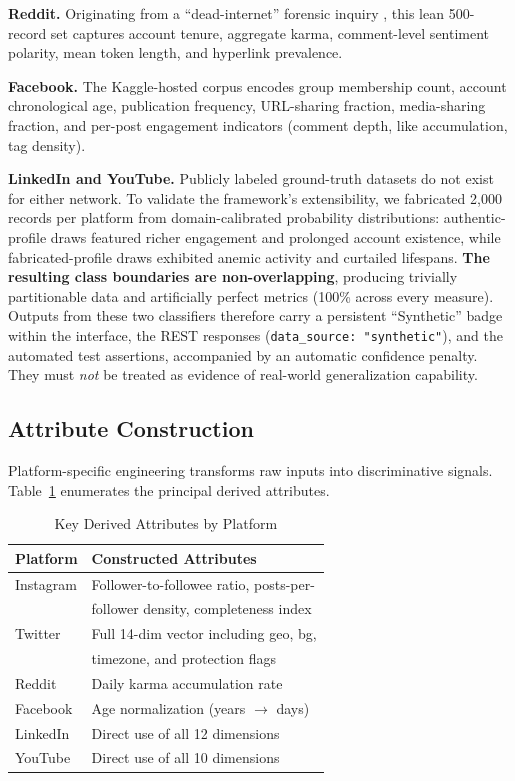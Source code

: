 \documentclass[conference]{IEEEtran}
\begin{document}
\textbf{Reddit.} Originating from a ``dead-internet'' forensic inquiry \cite{reddit_dataset}, this lean 500-record set captures account tenure, aggregate karma, comment-level sentiment polarity, mean token length, and hyperlink prevalence.

\textbf{Facebook.} The Kaggle-hosted corpus \cite{facebook_dataset} encodes group membership count, account chronological age, publication frequency, URL-sharing fraction, media-sharing fraction, and per-post engagement indicators (comment depth, like accumulation, tag density).

\textbf{LinkedIn and YouTube.} Publicly labeled ground-truth datasets do not exist for either network. To validate the framework's extensibility, we fabricated 2{,}000 records per platform from domain-calibrated probability distributions: authentic-profile draws featured richer engagement and prolonged account existence, while fabricated-profile draws exhibited anemic activity and curtailed lifespans. \textbf{The resulting class boundaries are non-overlapping}, producing trivially partitionable data and artificially perfect metrics (100\% across every measure). Outputs from these two classifiers therefore carry a persistent ``Synthetic'' badge within the interface, the REST responses (\texttt{data\_source: "synthetic"}), and the automated test assertions, accompanied by an automatic confidence penalty. They must \textit{not} be treated as evidence of real-world generalization capability.

\subsection{Attribute Construction}

Platform-specific engineering transforms raw inputs into discriminative signals. Table~\ref{tab:features} enumerates the principal derived attributes.

\begin{table}[htbp]
\caption{Key Derived Attributes by Platform}
\label{tab:features}
\centering
\begin{tabular}{ll}
\toprule
\textbf{Platform} & \textbf{Constructed Attributes} \\
\midrule
Instagram & Follower-to-followee ratio, posts-per- \\
          & follower density, completeness index \\
Twitter   & Full 14-dim vector including geo, bg, \\
          & timezone, and protection flags \\
Reddit    & Daily karma accumulation rate \\
Facebook  & Age normalization (years $\to$ days) \\
LinkedIn  & Direct use of all 12 dimensions \\
YouTube   & Direct use of all 10 dimensions \\
\bottomrule
\end{tabular}
\end{table}
\end{document}
